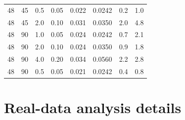 \documentclass[12pt,a4paper]{article}
\theoremstyle{plain}
\theoremstyle{definition}
\theoremstyle{remark}
\begin{document}
\begin{table}[H]
\begin{tabular}{rrrrrrrr}
48 & 45 & 0.5 & 0.05 & 0.022 & 0.0242 &  0.2 &  1.0 \\
48 & 45 & 2.0 & 0.10 & 0.031 & 0.0350 &  2.0 &  4.8 \\
48 & 90 & 1.0 & 0.05 & 0.024 & 0.0242 &  0.7 &  2.1 \\
48 & 90 & 2.0 & 0.10 & 0.024 & 0.0350 &  0.9 &  1.8 \\
48 & 90 & 4.0 & 0.20 & 0.034 & 0.0560 &  2.2 &  2.8 \\
48 & 90 & 0.5 & 0.05 & 0.021 & 0.0242 &  0.4 &  0.8 \\
\bottomrule
\end{tabular}
\end{table}

\section{Real-data analysis details}
\label{app:realdata}
\end{document}
